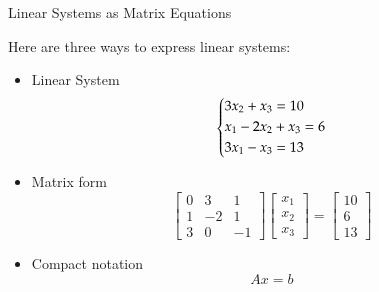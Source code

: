 \documentclass[10pt]{beamer}
\begin{document}
\begin{frame}{Linear Systems as Matrix Equations}

Here are three ways to express linear systems:\\[3mm]

\begin{itemize}
    \item Linear System
$$\begin{dcases}
3x_2 +x_3 = 10 \\ 
x_1 -2 x_2 + x_3= 6 \\
  3x_1 - x_3 = 13 \\
\end{dcases}$$


\item Matrix form
\begin{equation*}
    \begin{bmatrix}
    0 & 3 & 1\\ 
    1 & -2 & 1\\
    3 & 0 & -1
    \end{bmatrix} 
    \begin{bmatrix}
    x_1 \\
    x_2 \\
    x_3
    \end{bmatrix} = 
    \begin{bmatrix}
    10 \\
    6 \\
    13
    \end{bmatrix} 
\end{equation*}

\item Compact notation
\begin{equation*}
    Ax = b
\end{equation*}
\end{itemize}
\end{frame}
\end{document}
